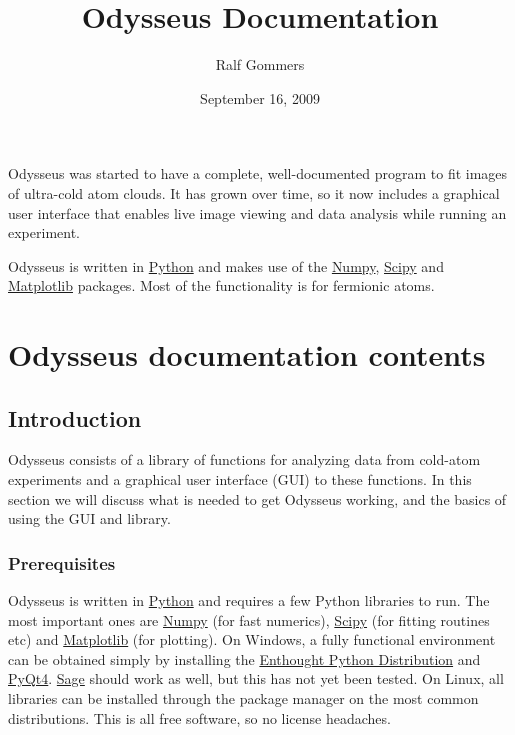 \documentclass[letterpaper,10pt,english]{manual}
\title{Odysseus Documentation}
\date{September 16, 2009}
\author{Ralf Gommers}
\begin{document}
\maketitle
\tableofcontents
\hypertarget{--doc-index}{}


Odysseus was started to have a complete, well-documented program to fit images of ultra-cold atom clouds. It has grown over time, so it now includes a graphical user interface that enables live image viewing and data analysis while running an experiment.

Odysseus is written in \href{http://python.org}{Python} and makes use of the \href{http://scipy.org/NumPy}{Numpy}, \href{http://scipy.org/}{Scipy} and \href{http://matplotlib.sourceforge.net/}{Matplotlib} packages. Most of the functionality is for fermionic atoms.


\chapter{Odysseus documentation contents}

\resetcurrentobjects
\hypertarget{--doc-introduction}{}

\section{Introduction}

Odysseus consists of a library of functions for analyzing data from cold-atom experiments and a graphical user interface (GUI) to these functions. In this section we will discuss what is needed to get Odysseus working, and the basics of using the GUI and library.


\subsection{Prerequisites}

Odysseus is written in \href{http://python.org}{Python} and requires a few Python libraries to run. The most important ones are \href{http://scipy.org/NumPy}{Numpy} (for fast numerics), \href{http://scipy.org/}{Scipy} (for fitting routines etc) and \href{http://matplotlib.sourceforge.net/}{Matplotlib} (for plotting). On Windows, a fully functional environment can be obtained simply by installing the \href{http://enthought.com/products/epd.php}{Enthought Python Distribution} and \href{http://www.riverbankcomputing.co.uk/software/pyqt/download}{PyQt4}. \href{http://www.sagemath.org/}{Sage} should work as well, but this has not yet been tested. On Linux, all libraries can be installed through the package manager on the most common distributions. This is all free software, so no license headaches.
\end{document}
